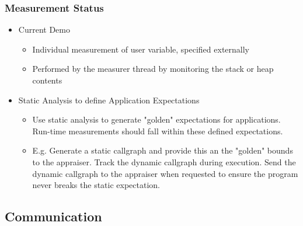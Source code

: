 \documentclass{beamer}
\begin{document}
\begin{frame}
  \frametitle{Measurement Status}
  \begin{itemize}
  \item Current Demo
    \begin{itemize}
    \item Individual measurement of user variable, specified externally
    \item Performed by the measurer thread by monitoring the stack or heap contents
    \end{itemize}    
   \item Static Analysis to define Application Expectations
    \begin{itemize}
    \item Use static analysis to generate "golden" expectations for applications. Run-time measurements should fall within these defined expectations.
    \item E.g. Generate a static callgraph and provide this an the "golden"
      bounds to the appraiser. Track the dynamic callgraph during execution.
      Send the dynamic callgraph to the appraiser when requested to ensure
      the program never breaks the static expectation.
    \end{itemize}   
  \end{itemize}
\end{frame}




\subsection{Communication}
\end{document}
